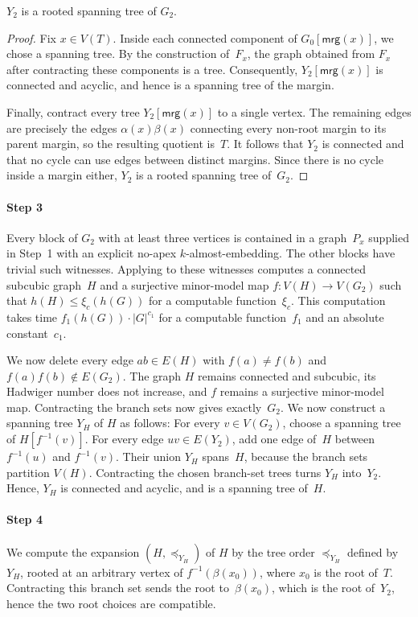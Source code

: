 \documentclass[1p,number,11pt]{elsarticle}
\theoremstyle{plain}
\newcommand{\mrg}{\mathsf{mrg}}
\renewcommand{\leq}{\leqslant}
\begin{document}
\begin{lemma}
    $Y_2$ is a rooted spanning tree of $G_2$.
\end{lemma}
\begin{proof}
Fix $x\in V(T)$.  Inside each connected component of
$G_0[\mrg(x)]$, we chose a spanning tree.  By the construction of~$F_x$, the
graph obtained from $F_x$ after contracting these components is a tree.
Consequently, $Y_2[\mrg(x)]$ is connected and acyclic, and hence is a spanning
tree of the margin.

Finally, contract every tree $Y_2[\mrg(x)]$ to a single vertex.  The remaining
edges are precisely the edges $\alpha(x)\beta(x)$ connecting every non-root
margin to its parent margin, so the resulting quotient is~$T$.  It follows
that $Y_2$ is connected and that no cycle can use edges between distinct
margins.  Since there is no cycle inside a margin either, $Y_2$ is a rooted
spanning tree of~$G_2$.
\end{proof}

\paragraph{Step 3}

Every block of $G_2$ with at least three vertices is contained in a
graph~$P_x$ supplied in Step~1 with an explicit no-apex $k$-almost-embedding. The other
blocks have trivial such witnesses. Applying
 to these witnesses computes a connected
subcubic graph~$H$ and a surjective minor-model map
$f\colon V(H)\to V(G_2)$ such that
$h(H)\leq\xi_c(h(G))$ for a computable function~$\xi_c$.
This computation takes time $f_1(h(G))\cdot |G|^{c_1}$ for a computable
function~$f_1$ and an absolute constant~$c_1$.

We now delete every edge $ab\in E(H)$ with $f(a)\neq f(b)$ and $f(a)f(b)\notin E(G_2)$.
The graph $H$ remains connected and subcubic, its Hadwiger number does not increase, and $f$ remains a surjective minor-model map.
Contracting the branch sets now gives exactly~$G_2$.
We now construct a spanning tree $Y_H$ of $H$ as follows: 
For every $v\in V(G_2)$, choose a spanning tree of $H[f^{-1}(v)]$. 
For every edge $uv\in E(Y_2)$, add one edge of~$H$ between $f^{-1}(u)$ and $f^{-1}(v)$. 
Their union $Y_H$ spans~$H$, because the branch sets partition $V(H)$. 
Contracting the chosen branch-set trees turns $Y_H$ into~$Y_2$. 
Hence, $Y_H$ is connected and acyclic, and is a spanning tree of~$H$.

\paragraph{Step 4}
We compute the expansion $(H,\preceq_{Y_H})$ of $H$ by the tree order $\preceq_{Y_H}$ defined by $Y_H$,
rooted at an arbitrary vertex of $f^{-1}(\beta(x_0))$, where $x_0$ is the root
of~$T$.  Contracting this branch set sends the root to~$\beta(x_0)$, which is
the root of~$Y_2$, hence the two root choices are compatible.
\end{document}
